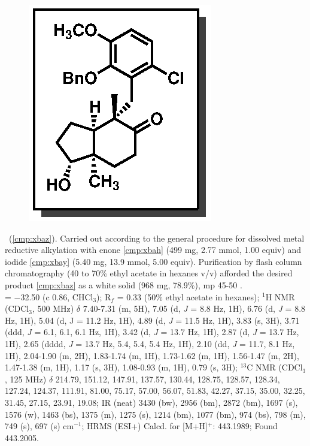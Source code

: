 \vspace{10pt}
\begin{figure}
  \vspace{-25pt}
  \begin{center}
    \includegraphics[scale=0.8]{chp_singlecarbon/images/xbaz}
  \end{center}
  \vspace{-30pt}
\end{figure}\noindent \textbf{\CMPxbaz}\ (\ref{cmp:xbaz}). Carried out according to the general procedure
for dissolved metal reductive alkylation with enone \ref{cmp:xbah} (499 mg, 2.77 mmol, 1.00
equiv) and iodide \ref{cmp:xbay} (5.40 mg, 13.9 mmol, 5.00 equiv). Purification by
flash column chromatography (40 to 70\% ethyl acetate in hexanes v/v)
afforded the desired product \ref{cmp:xbaz} as a white solid (968 mg, 78.9\%), mp 45-50 \degc.\\
\rotation = $-$32.50 (c 0.86, CHCl$_3$); R$_f$ = 0.33 (50\% ethyl acetate in hexanes); $^1$H NMR (CDCl$_3$,
500 MHz) $\delta$ 7.40-7.31 (m, 5H), 7.05 (d, \textit{J} = 8.8 Hz, 1H), 6.76 (d, \textit{J} = 8.8 Hz, 1H), 5.04 (d, J =
11.2 Hz, 1H), 4.89 (d, \textit{J} = 11.5 Hz, 1H), 3.83 (s, 3H), 3.71 (ddd, \textit{J} = 6.1, 6.1, 6.1 Hz, 1H), 3.42 (d,
\textit{J} = 13.7 Hz, 1H), 2.87 (d, \textit{J} = 13.7 Hz, 1H), 2.65 (dddd, \textit{J} = 13.7 Hz, 5.4, 5.4, 5.4 Hz, 1H), 2.10
(dd, \textit{J} = 11.7, 8.1 Hz, 1H), 2.04-1.90 (m, 2H), 1.83-1.74 (m, 1H), 1.73-1.62 (m, 1H), 1.56-1.47
(m, 2H), 1.47-1.38 (m, 1H), 1.17 (s, 3H), 1.08-0.93 (m, 1H), 0.79 (s, 3H); $^{13}$C NMR (CDCl$_3$, 125
MHz) $\delta$ 214.79, 151.12, 147.91, 137.57, 130.44, 128.75, 128.57, 128.34, 127.24, 124.37, 111.91,
81.00, 75.17, 57.00, 56.07, 51.83, 42.27, 37.15, 35.00, 32.25, 31.45, 27.15, 23.91, 19.08; IR
(neat) 3430 (bw), 2956 (bm), 2872 (bm), 1697 (s), 1576 (w), 1463 (bs), 1375 (m), 1275 (s), 1214
(bm), 1077 (bm), 974 (bs), 798 (m), 749 (s), 697 (s) cm$^{-1}$; HRMS (ESI+) Calcd. for
 [M+H]$^+$: 443.1989; Found 443.2005.

